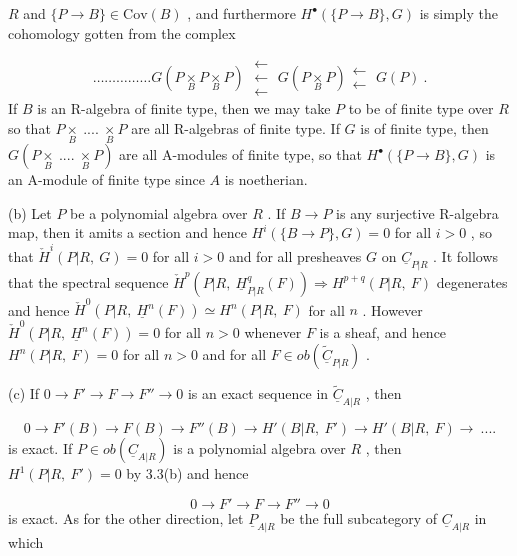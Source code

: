 $R$  and  $\{P \to B\} \in \mathrm{Cov}(B)$  , and furthermore  $H^{\bullet}(\{P \to B\},G)$  is simply the
cohomology gotten from the complex

\begin{equation*}
\dots\dots\dots\dots\dots G(P \underset{B}{\times} P \underset{B}{\times} P) \;\substack{\longleftarrow\\ \longleftarrow\\ \longleftarrow}\; G(P \underset{B}{\times} P) \substack{\longleftarrow\\ \longleftarrow}\; G(P) \ .
\end{equation*}
If  $B$  is an R-algebra of finite type, then we may take  $P$  to be of finite type over  $R$  so that  $P\underset{B}{\times}\ ....\ \underset{B}{\times}P$  are all R-algebras of finite type. If  $G$  is of finite type, then  $G(P\underset{B}{\times}\ ....\ \underset{B}{\times}P)$  are all A-modules of finite type, so that  $H^{\bullet}(\{P \to B\},G)$  is an A-module of finite type since  $A$  is noetherian.

(b)  Let  $P$  be a polynomial algebra over  $R$ . If  $B \to P$  is any surjective R-algebra map, then it amits a section and hence  $H^{i}(\{B \to P\},G) = 0$  for all  $i > 0$ , so that  $\check{H}^{i}(P|R,\ G) = 0$  for all  $i > 0$  and for all presheaves  $G$  on  $\underline{C}_{P|R}$ . It follows that the spectral sequence  $\check{H}^{p}(P|R,\ \underline{H}^{q}_{P|R}(F)) \Rightarrow H^{p+q}(P|R,\ F)$  degenerates and hence  $\check{H}^{0}(P|R,\ \underline{H}^{n}(F)) \simeq H^{n}(P|R,\ F)$  for all  $n$ . However  $\check{H}^{0}(P|R,\ \underline{H}^{n}(F)) = 0$  for all  $n > 0$  whenever  $F$  is a sheaf, and hence  $H^{n}(P|R,\ F) = 0$  for all  $n > 0$  and for all  $F \in ob(\widetilde{\underline{C}}_{P|R})$ .

(c)  If  $0 \to F' \to F \to F'' \to 0$  is an exact sequence in  $\widetilde{\underline{C}}_{A|R}$ , then

\begin{equation*}
0 \to F'(B) \to F(B) \to F''(B) \to H'(B|R,\ F') \to H'(B|R,\ F) \to \ ....
\end{equation*}
is exact. If  $P \in ob(\underline{C}_{A|R})$  is a polynomial algebra over  $R$ , then  $H^{1}(P|R,\ F') = 0$  by 3.3(b) and hence

\begin{equation*}
0 \to F' \to F \to F'' \to 0
\end{equation*}
is exact. As for the other direction, let  $\underline{P}_{A|R}$  be the full subcategory of  $\underline{C}_{A|R}$  in which

